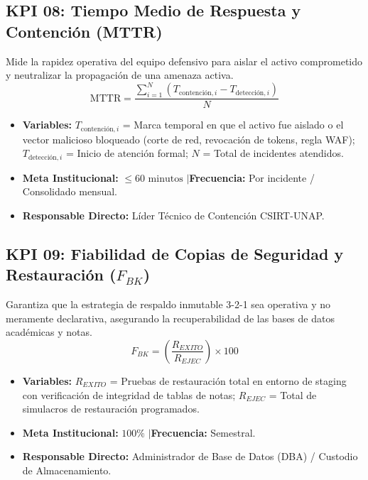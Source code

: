 \subsection{KPI 08: Tiempo Medio de Respuesta y Contención (MTTR)}
Mide la rapidez operativa del equipo defensivo para aislar el activo comprometido y neutralizar la propagación de una amenaza activa.
\[
\text{MTTR} = \frac{\sum_{i=1}^{N} \left( T_{\text{contención}, i} - T_{\text{detección}, i} \right)}{N}
\]
\begin{itemize}[leftmargin=1.5em, itemsep=1pt]
    \item \textbf{Variables:} $T_{\text{contención}, i}$ = Marca temporal en que el activo fue aislado o el vector malicioso bloqueado (corte de red, revocación de tokens, regla WAF); $T_{\text{detección}, i}$ = Inicio de atención formal; $N$ = Total de incidentes atendidos.
    \item \textbf{Meta Institucional:} $\le 60\text{ minutos}$ \quad$\vert$\quad \textbf{Frecuencia:} Por incidente / Consolidado mensual.
    \item \textbf{Responsable Directo:} Líder Técnico de Contención CSIRT-UNAP.
\end{itemize}

\subsection{KPI 09: Fiabilidad de Copias de Seguridad y Restauración \texorpdfstring{($F_{BK}$)}{(F\_BK)}}
Garantiza que la estrategia de respaldo inmutable 3-2-1 sea operativa y no meramente declarativa, asegurando la recuperabilidad de las bases de datos académicas y notas.
\[
F_{BK} = \left( \frac{R_{EXITO}}{R_{EJEC}} \right) \times 100
\]
\begin{itemize}[leftmargin=1.5em, itemsep=1pt]
    \item \textbf{Variables:} $R_{EXITO}$ = Pruebas de restauración total en entorno de staging con verificación de integridad de tablas de notas; $R_{EJEC}$ = Total de simulacros de restauración programados.
    \item \textbf{Meta Institucional:} $100\%$ \quad$\vert$\quad \textbf{Frecuencia:} Semestral.
    \item \textbf{Responsable Directo:} Administrador de Base de Datos (DBA) / Custodio de Almacenamiento.
\end{itemize}

